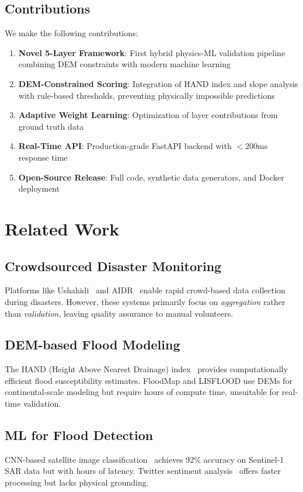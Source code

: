 \documentclass[conference]{IEEEtran}
\begin{document}
\subsection{Contributions}
We make the following contributions:
\begin{enumerate}
    \item \textbf{Novel 5-Layer Framework}: First hybrid physics-ML validation pipeline combining DEM constraints with modern machine learning
    \item \textbf{DEM-Constrained Scoring}: Integration of HAND index and slope analysis with rule-based thresholds, preventing physically impossible predictions
    \item \textbf{Adaptive Weight Learning}: Optimization of layer contributions from ground truth data
    \item \textbf{Real-Time API}: Production-grade FastAPI backend with $<$200ms response time
    \item \textbf{Open-Source Release}: Full code, synthetic data generators, and Docker deployment
\end{enumerate}

\section{Related Work}
\label{sec:related_work}

\subsection{Crowdsourced Disaster Monitoring}
Platforms like Ushahidi~\cite{ushahidi2008} and AIDR~\cite{imran2014} enable rapid crowd-based data collection during disasters. However, these systems primarily focus on \textit{aggregation} rather than \textit{validation}, leaving quality assurance to manual volunteers.

\subsection{DEM-based Flood Modeling}
The HAND (Height Above Nearest Drainage) index~\cite{nobre2011} provides computationally efficient flood susceptibility estimates. FloodMap and LISFLOOD use DEMs for continental-scale modeling but require hours of compute time, unsuitable for real-time validation.

\subsection{ML for Flood Detection}
CNN-based satellite image classification~\cite{sentinel2020} achieves 92\% accuracy on Sentinel-1 SAR data but with hours of latency. Twitter sentiment analysis~\cite{socialmedia2018} offers faster processing but lacks physical grounding.
\end{document}
